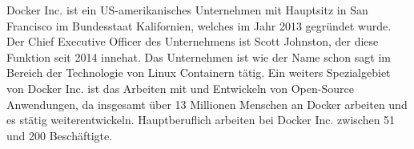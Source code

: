 
Docker Inc. ist ein US-amerikanisches Unternehmen mit Hauptsitz in San Francisco im Bundesstaat Kalifornien, welches im Jahr 2013 gegründet wurde. Der Chief Executive Officer des Unternehmens ist Scott Johnston, der diese Funktion seit 2014 innehat. Das Unternehmen ist wie der Name schon sagt im Bereich der Technologie von Linux Containern tätig. Ein weiters Spezialgebiet von Docker Inc. ist das Arbeiten mit und Entwickeln von Open-Source Anwendungen, da insgesamt über 13 Millionen Menschen an Docker arbeiten und es stätig weiterentwickeln. Hauptberuflich arbeiten bei Docker Inc. zwischen 51 und 200 Beschäftigte. \cite{DockerInc} \cite{Docker}
